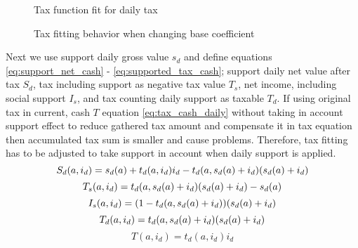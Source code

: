 \begin{figure} %
 \begin{center}
  \caption{Tax function fit for daily tax}
  \label{fig:DailyTax}
 \end{center}
\end{figure}
\begin{figure} %
 \begin{center}
  \caption{Tax fitting behavior when changing base coefficient}
  \label{fig:BaseTax}
 \end{center}
\end{figure}

Next we use support daily gross value $s_d$ and define equations \ref{eq:support_net_cash} - \ref{eq:supported_tax_cash};
support daily net value after tax $S_d$, tax including support as negative tax value $T_s$, net income,
including social support $I_s$, and tax counting daily support as taxable $T_d$.
If using original tax in current, cash $T$ equation \ref{eq:tax_cash_daily}
without taking in account support effect to reduce gathered tax amount and compensate it in tax equation
then accumulated tax sum is smaller and cause problems.
Therefore, tax fitting has to be adjusted to take support in account when daily support is applied.
\begin{equation} \label{eq:support_net_cash} \index{support daily}
S_d(a,i_d) = s_d(a) + t_d(a,i_d)i_d - t_d(a,s_d(a)+i_d)(s_d(a)+i_d)
\end{equation}
\begin{equation} \label{eq:supported_tax_cash} \index{tax negative}
T_s(a,i_d)=t_d(a,s_d(a)+i_d)(s_d(a)+i_d)-s_d(a)
\end{equation}
\begin{equation} \label{eq:supported_cash_net} \index{income supported}
I_s(a,i_d)=(1-t_d(a,s_d(a)+i_d))(s_d(a)+i_d)
\end{equation}
\begin{equation} \label{eq:supported_tax_cash_daily} \index{tax daily}
T_d(a,i_d)=t_d(a,s_d(a)+i_d)(s_d(a)+i_d)
\end{equation}
\begin{equation} \label{eq:tax_cash_daily}
T(a,i_d)=t_d(a,i_d)i_d
\end{equation}

